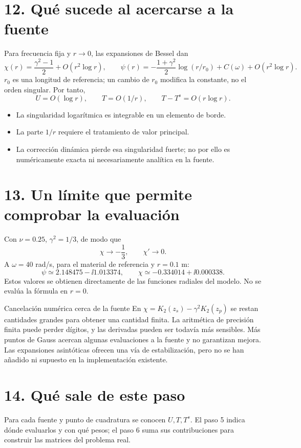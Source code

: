 \documentclass[11pt]{article}
\begin{document}
\newpage
\section*{12. Qué sucede al acercarse a la fuente}
Para frecuencia fija y \(r\to0\), las expansiones de Bessel dan
\[
 \chi(r)=\frac{\gamma^2-1}{2}+O(r^2\log r),\qquad
 \psi(r)=-\frac{1+\gamma^2}{2}\log(r/r_0)+C(\omega)
          +O(r^2\log r).
\]
\(r_0\) es una longitud de referencia; un cambio de \(r_0\) modifica la
constante, no el orden singular. Por tanto,
\[
 U=O(\log r),\qquad T=O(1/r),\qquad T-T^s=O(r\log r).
\]
\begin{itemize}
 \item La singularidad logarítmica es integrable en un elemento de borde.
 \item La parte \(1/r\) requiere el tratamiento de valor principal.
 \item La corrección dinámica pierde esa singularidad fuerte; no por ello
 es numéricamente exacta ni necesariamente analítica en la fuente.
\end{itemize}

\section*{13. Un límite que permite comprobar la evaluación}
Con \(\nu=0.25\), \(\gamma^2=1/3\), de modo que
\[
 \chi\longrightarrow-\frac13,\qquad \chi'\longrightarrow0.
\]
A \(\omega=40\) rad/s, para el material de referencia y \(r=0.1\) m:
\[
 \psi\simeq2.148475-\ii1.013374,\qquad
 \chi\simeq-0.334014+\ii0.000338.
\]
Estos valores se obtienen directamente de las funciones radiales del modelo.
No se evalúa la fórmula en \(r=0\).

\begin{alerta}{Cancelación numérica cerca de la fuente}
En \(\chi=K_2(z_s)-\gamma^2K_2(z_p)\) se restan cantidades grandes para
obtener una cantidad finita. La aritmética de precisión finita puede perder
dígitos, y las derivadas pueden ser todavía más sensibles. Más puntos de
Gauss acercan algunas evaluaciones a la fuente y no garantizan mejora.
Las expansiones asintóticas ofrecen una vía de estabilización, pero no se
han añadido ni supuesto en la implementación existente.
\end{alerta}
\section*{14. Qué sale de este paso}
Para cada fuente y punto de cuadratura se conocen \(U,T,T^s\).
El paso 5 indica dónde evaluarlos y con qué pesos; el paso 6 suma sus
contribuciones para construir las matrices del problema real.
\fuentes
\end{document}
